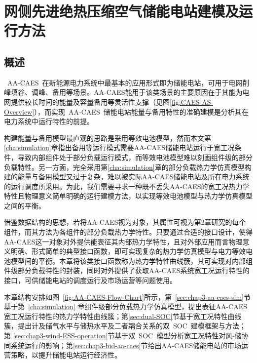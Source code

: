 \chapter{网侧先进绝热压缩空气储能电站建模及运行方法}
\label{cha:aa-caes}

\section{概述}
\label{sec:aa-caes-intro}
~AA-CAES~在新能源电力系统中最基本的应用形式即为储能电站，可用于电网削峰填谷、调峰、备用等场景\cite{CAES-DAM-Rui-18}。AA-CAES能用于该类场景的主要原因在于其能为电网提供较长时间的能量及容量备用等灵活性支撑（见图\ref{fig:CAES-AS-Overview}），而实现~AA-CAES~储能电站能量与备用特性的准确建模是分析其在电力系统中运行特性的前提。

构建能量与备用模型最直观的思路是采用等效电池模型，然而本文第\ref{cha:simulation}章指出备用等运行模式需要AA-CAES储能电站运行于宽工况条件，导致内部组件处于部分负载运行模式，而等效电池模型难以刻画组件级的部分负载特性。另一方面，完全采用第\ref{cha:simulation}章的部分负载热力学仿真模型构建的能量与备用模型又过于复杂，难以被实际AA-CAES储能电站及所在电力系统的运行调度所采用。为此，我们需要寻求一种既不丢失AA-CAES的宽工况热力学特性且物理意义简单明确的运行建模方法，以实现等效电池模型与热力学仿真模型之间的平衡。

借鉴数据结构的思想，若将AA-CAES视为对象，其属性可视为第2章研究的每个组件，而其方法为各组件的部分负载热力学特性。只要通过合适的接口设计，使得AA-CAES这一对象对外提供能表征其内部热力学特性，且对外部应用而言物理意义明确、形式简单的典型接口函数，即可实现复杂的热力学仿真模型与电力等效电池模型间的平衡。本章将该类接口函数称为热力学特性曲线簇，其可实现对内部组件级部分负载特性的封装，同时对外提供了获取AA-CAES系统宽工况运行特性的接口，可供储能电站的调度运行及市场运营等问题使用。

本章结构安排如图~\ref{fig:AA-CAES-Flow-Chart}所示，第~\ref{sec:chap3-aa-caes-sim}节基于第~\ref{cha:simulation} 章组件级部分负载热力学仿真模型，提出表征AA-CAES宽工况运行特性的热力学特性曲线簇；第\ref{sec:dual-SOC}节基于宽工况特性曲线簇，提出计及储气水平与储热水平及二者耦合关系的双~SOC~建模框架与方法；第
\ref{sec:chap3-wind-ESS-operation}节基于双~SOC~模型分析宽工况特性对风-储协同系统运行的影响；第\ref{sec:chap3-bid-aa-caes}节给出AA-CAES储能电站的市场运营策略，以提升储能电站运行经济性。

